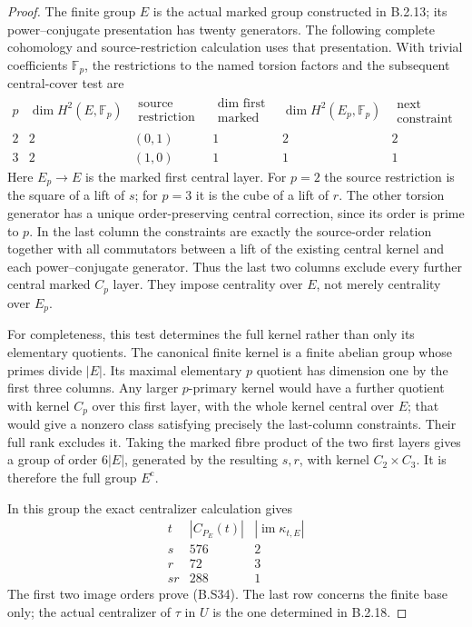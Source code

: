 \begin{proof}
The finite group $E$ is the actual marked group
constructed in B.2.13; its power--conjugate
presentation has twenty generators.  The following
complete cohomology and source-restriction calculation
uses that presentation.  With trivial coefficients
$\mathbb F_p$, the restrictions to the named torsion
factors and the subsequent central-cover test are
\[
\begin{array}{c|c|c|c|c|c}
 p&\dim H^2(E,\mathbb F_p)&
 \substack{\text{source}\\\text{restriction vector}}&
 \substack{\dim\text{ first}\\\text{marked layer}}&
 \dim H^2(E_p,\mathbb F_p)&
 \substack{\text{next}\\\text{constraint rank}}\\ \hline
 2&2&(0,1)&1&2&2\\
 3&2&(1,0)&1&1&1
\end{array}                                                     \tag{B.S36}
\]
Here $E_p\to E$ is the marked first central layer.
For $p=2$ the source restriction is the square of a
lift of $s$; for $p=3$ it is the cube of a lift of
$r$.  The other torsion generator has a unique
order-preserving central correction, since its order
is prime to $p$.  In the last column the constraints
are exactly the source-order relation together with
all commutators between a lift of the existing
central kernel and each power--conjugate generator.
Thus the last two columns exclude every further
central marked $C_p$ layer.  They impose centrality
over $E$, not merely centrality over $E_p$.

For completeness, this test determines the full
kernel rather than only its elementary quotients.
The canonical finite kernel is a finite abelian group
whose primes divide $|E|$.  Its maximal elementary
$p$ quotient has dimension one by the first three
columns.  Any larger $p$-primary kernel would have
a further quotient with kernel $C_p$ over this
first layer, with the whole kernel central over $E$;
that would give a nonzero class satisfying precisely
the last-column constraints.  Their full rank excludes
it.  Taking the marked fibre product of the two first
layers gives a group of order $6|E|$, generated by
the resulting $s,r$, with kernel $C_2\times C_3$.
It is therefore the full group $E^{\mathrm c}$.

In this group the exact centralizer calculation gives
\[
\begin{array}{c|c|c}
 t&|C_{P_E}(t)|&|\operatorname{im}\kappa_{t,E}|\\ \hline
 s&576&2\\
 r&72&3\\
 sr&288&1
\end{array}                                                     \tag{B.S37}
\]
The first two image orders prove (B.S34).  The last
row concerns the finite base only; the actual
centralizer of $\tau$ in $U$ is the one determined
in B.2.18.


\end{proof}
